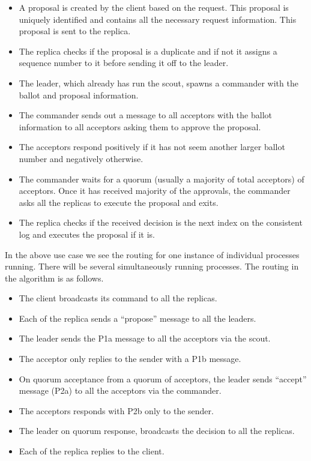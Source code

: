 \begin{itemize}
    \item A proposal is created by the client based on the request. This
      proposal is uniquely identified and contains all the necessary request
      information. This proposal is sent to the replica.
    \item The replica checks if the proposal is a duplicate and if not it
      assigns a sequence number%
      to it before sending it off to the leader.
    \item The leader, which already has run the scout, spawns a commander with
      the ballot and proposal information.
    \item The commander sends out a message to all acceptors with the ballot
      information to all acceptors asking them to approve the proposal.
    \item The acceptors respond positively if it has not seem another larger
      ballot number and negatively otherwise.
    \item The commander waits for a quorum (usually a majority of total
      acceptors) of acceptors. Once it has received majority of the approvals,
      the commander asks all the replicas to execute the proposal and exits.
    \item The replica checks if the received decision is the next index on
      the consistent log and executes the proposal if it is.
\end{itemize}

In the above use case we see the routing for one instance of individual
processes running. There will be several simultaneously running processes. The
routing in the algorithm is as follows.

\begin{itemize}
  \item The client broadcasts its command to all the replicas.
  \item Each of the replica sends a ``propose'' message to all the leaders.
  \item The leader sends the P1a message to all the acceptors via the scout.
  \item The acceptor only replies to the sender with a P1b message.
  \item On quorum acceptance from a quorum of acceptors, the leader sends
    ``accept'' message (P2a) to all the acceptors via the commander.
  \item The acceptors responds with P2b only to the sender.
  \item The leader on quorum response, broadcasts the decision to all the
    replicas.
  \item Each of the replica replies to the client.
\end{itemize}

